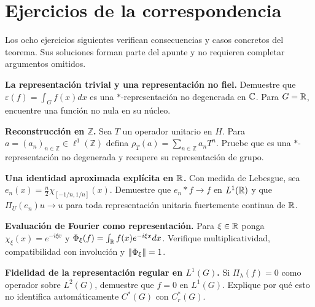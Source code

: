 \section{Ejercicios de la correspondencia}

Los ocho ejercicios siguientes verifican consecuencias y casos concretos del teorema. Sus soluciones forman parte del apunte y no requieren completar argumentos omitidos.

\begin{ejercicio}\label{ej:v4-l24-1}
\textbf{La representación trivial y una representación no fiel.}
Demuestre que $\varepsilon(f)=\int_G f(x)dx$ es una $*$-representación no degenerada en $\mathbb C$. Para $G=\mathbb R$, encuentre una función no nula en su núcleo.

\end{ejercicio}


\begin{ejercicio}\label{ej:v4-l24-2}
\textbf{Reconstrucción en $\mathbb Z$.}
Sea $T$ un operador unitario en $H$. Para $a=(a_n)_{n\in\mathbb Z}\in\ell^1(\mathbb Z)$ defina $\rho_T(a)=\sum_{n\in\mathbb Z}a_nT^n$. Pruebe que es una $*$-representación no degenerada y recupere su representación de grupo.

\end{ejercicio}


\begin{ejercicio}\label{ej:v4-l24-3}
\textbf{Una identidad aproximada explícita en $\mathbb R$.}
Con medida de Lebesgue, sea $e_n(x)=\tfrac n2\chi_{[-1/n,1/n]}(x)$. Demuestre que $e_n*f\to f$ en $L^1(\mathbb R)$ y que $\Pi_U(e_n)u\to u$ para toda representación unitaria fuertemente continua de $\mathbb R$.

\end{ejercicio}


\begin{ejercicio}\label{ej:v4-l24-4}
\textbf{Evaluación de Fourier como representación.}
Para $\xi\in\mathbb R$ ponga $\chi_\xi(x)=e^{-i\xi x}$ y $\Phi_\xi(f)=\int_\mathbb R f(x)e^{-i\xi x}dx$. Verifique multiplicatividad, compatibilidad con involución y $\left\lVert\Phi_\xi\right\rVert=1$.

\end{ejercicio}


\begin{ejercicio}\label{ej:v4-l24-5}
\textbf{Fidelidad de la representación regular en $L^1(G)$.}
Si $\Pi_\lambda(f)=0$ como operador sobre $L^2(G)$, demuestre que $f=0$ en $L^1(G)$. Explique por qué esto no identifica automáticamente $C^*(G)$ con $C_r^*(G)$.

\end{ejercicio}



